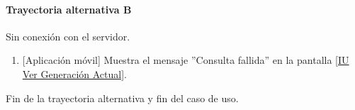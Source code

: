 \paragraph{Trayectoria alternativa B} \label{SUB-U-CU1.1:TB}
	Sin conexión con el servidor.
	\begin{enumerate}[label=B\arabic*.]
		\item {[Aplicación móvil]} Muestra el mensaje ''Consulta fallida'' en la pantalla \hyperref[fig:monitoreoReal]{[IU Ver Generación Actual]}.
	\end{enumerate}
	Fin de la trayectoria alternativa y fin del caso de uso.
